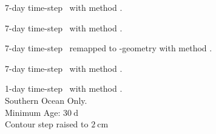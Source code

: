 \begin{fullwidth}
\begin{multicols}{2}
\begin{definition}\label{def:aviI}
7-day time-step \AVI~with method \MI.
\end{definition}
\begin{definition}\label{def:aviII}
7-day time-step \AVI~with method \MII.
\end{definition}
\begin{definition}\label{def:p2aII}
7-day time-step \POP~remapped to \AVI-geometry with method \MII.
\end{definition}
\begin{definition}\label{def:pop7II}
7-day time-step \POP~with method \MII.
\end{definition}
\begin{definition}\label{def:pop1IISO}
1-day time-step \AVI~with method \MII. \\Southern Ocean Only. \\Minimum Age: $\SI{30}{\day}$ \\
Contour step raised to $\SI{2}{\cm}$
\end{definition}


\end{multicols}
\end{fullwidth}
